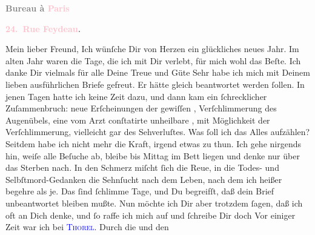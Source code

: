            \pstart
           \begin{otherlanguage}{french}\textcolor{gray}{\textbf{\textbf{Bureau à \textcolor{pink}{Paris}{}\ledrightnote{\textcolor{pink}{Paris}}}}}\end{otherlanguage}\pend
           \pstart
           \begin{otherlanguage}{french}\textcolor{gray}{\textbf{\textbf{\textcolor{pink}{24. Rue Feydeau}{}\ledrightnote{\textcolor{pink}{rue Feydeau}}.}}}\end{otherlanguage}\pend
           \pstart{}Mein lieber Freund,\pend\pstart
           Ich wünſche Dir von Herzen ein glückliches neues Jahr. Im
               alten Jahr waren die Tage, die ich mit Dir verlebt, für mich
               wohl das Beſte. Ich danke Dir \strikeout{\textcolor{gray}{×}\-\textcolor{gray}{×}\-\textcolor{gray}{×}\-\textcolor{gray}{×}} vielmals für alle Deine Treue und Güte{\dotsseven}\pend
           \pstart
           Sehr habe ich mich mit Deinem lieben ausführlichen Briefe gefreut. Er hätte gleich
               beantwortet werden ſollen. In jenen Tagen hatte ich keine Zeit dazu, und dann kam ein
               ſchrecklicher  Zuſammenbruch: neue Erſcheinungen der gewiſſen \label{K_L02792-1v}\label{K_L02792-1h}, Verſchlimmerung des Augenübels, eine vom Arzt
               conſtatirte unheilbare \label{K_L02792-2v}\label{K_L02792-2h}, {\pb}mit Möglichkeit der Verſchlimmerung, vielleicht gar
               des Sehverluſtes. Was ſoll ich das Alles aufzählen? Seitdem habe ich nicht mehr die
               Kraft, irgend etwas zu thun. Ich gehe nirgends hin, weiſe alle Beſuche ab, bleibe bis
                  Mittag im Bett liegen und denke nur über das Sterben nach. In den
               Schmerz miſcht ſich die Reue, in die Todes- und Selbſtmord-Gedanken die Sehnſucht
               nach dem Leben, nach dem ich heißer begehre als je. Das ſind ſchlimme Tage, und Du
               begreifſt, daß  dein Brief
               unbeantwortet bleiben mußte. Nun möchte ich Dir aber trotzdem ſagen, daß ich oft an
               Dich denke, und ſo raffe ich mich auf und ſchreibe Dir doch{\dotssix}\pend
           \pstart
           {\pb}Vor einiger Zeit war ich bei \textsc{\textcolor{blue}{Thorel}{}\ledrightnote{\textcolor{blue}{Jean Thorel}}}. Durch die \label{K_L02792-3v}\label{K_L02792-3h} und den
